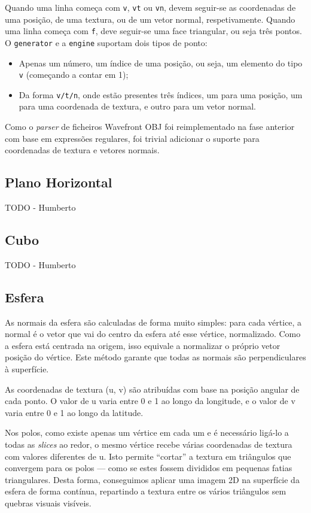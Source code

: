 \documentclass[12pt, a4paper]{article}
\begin{document}
Quando uma linha começa com \texttt{v}, \texttt{vt} ou \texttt{vn}, devem seguir-se as coordenadas
de uma posição, de uma textura, ou de um vetor normal, respetivamente. Quando uma linha começa com
\texttt{f}, deve seguir-se uma face triangular, ou seja três pontos. O \texttt{generator} e a
\texttt{engine} suportam dois tipos de ponto:

\begin{itemize}
    \item Apenas um número, um índice de uma posição, ou seja, um elemento do tipo \texttt{v}
        (começando a contar em 1);
    \item Da forma \texttt{v/t/n}, onde estão presentes três índices, um para uma posição, um para
        uma coordenada de textura, e outro para um vetor normal.
\end{itemize}

Como o \emph{parser} de ficheiros Wavefront OBJ foi reimplementado na fase anterior com base em
expressões regulares, foi trivial adicionar o suporte para coordenadas de textura e vetores normais.

\subsection{Plano Horizontal}

{\color{red} TODO - Humberto}

\subsection{Cubo}

{\color{red} TODO - Humberto}

\subsection{Esfera}

As normais da esfera são calculadas de forma muito simples: para cada vértice, a normal é o vetor
que vai do centro da esfera até esse vértice, normalizado. Como a esfera está centrada na origem,
isso equivale a normalizar o próprio vetor posição do vértice. Este método garante que todas as
normais são perpendiculares à superfície.

As coordenadas de textura (u, v) são atribuídas com base na posição angular de cada ponto. O valor
de u varia entre 0 e 1 ao longo da longitude, e o valor de v varia entre 0 e 1 ao longo da latitude.

Nos polos, como existe apenas um vértice em cada um e é necessário ligá-lo a todas as \emph{slices}
ao redor, o mesmo vértice recebe várias coordenadas de textura com valores diferentes de u.
Isto permite ``cortar'' a textura em triângulos que convergem para os polos — como se estes fossem
divididos em pequenas fatias triangulares.
Desta forma, conseguimos aplicar uma imagem 2D na superfície da esfera de forma contínua, repartindo
a textura entre os vários triângulos sem quebras visuais visíveis.
\end{document}
